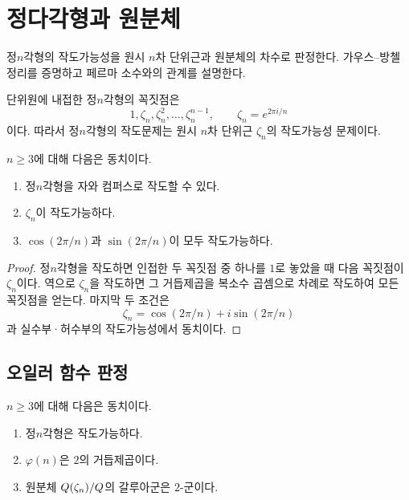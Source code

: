 \clearpage
\section{정다각형과 원분체}
\label{sec:construction-regular-polygons}

\begin{learninggoal}
정$n$각형의 작도가능성을 원시 $n$차 단위근과 원분체의 차수로 판정한다. 가우스--방첼 정리를 증명하고 페르마 소수와의 관계를 설명한다.
\end{learninggoal}

단위원에 내접한 정$n$각형의 꼭짓점은
\[
  1,\zeta_n,\zeta_n^2,\dots,\zeta_n^{n-1},
  \qquad
  \zeta_n=e^{2\pi i/n}
\]
이다. 따라서 정$n$각형의 작도문제는 원시 $n$차 단위근 $\zeta_n$의 작도가능성 문제이다.

\begin{proposition}
$n\ge3$에 대해 다음은 동치이다.
\begin{enumerate}[label=(\roman*)]
  \item 정$n$각형을 자와 컴퍼스로 작도할 수 있다.
  \item $\zeta_n$이 작도가능하다.
  \item $\cos(2\pi/n)$과 $\sin(2\pi/n)$이 모두 작도가능하다.
\end{enumerate}
\end{proposition}

\begin{proof}
정$n$각형을 작도하면 인접한 두 꼭짓점 중 하나를 $1$로 놓았을 때 다음 꼭짓점이 $\zeta_n$이다. 역으로 $\zeta_n$을 작도하면 그 거듭제곱을 복소수 곱셈으로 차례로 작도하여 모든 꼭짓점을 얻는다. 마지막 두 조건은
\[
  \zeta_n=\cos(2\pi/n)+i\sin(2\pi/n)
\]
과 실수부·허수부의 작도가능성에서 동치이다.
\end{proof}

\subsection{오일러 함수 판정}

\begin{theorem}[정다각형 작도 판정]
\label{thm:regular-polygon-phi}
$n\ge3$에 대해 다음은 동치이다.
\begin{enumerate}[label=(\roman*)]
  \item 정$n$각형은 작도가능하다.
  \item $\varphi(n)$은 $2$의 거듭제곱이다.
  \item 원분체 $Q(\zeta_n)/Q$의 갈루아군은 $2$-군이다.
\end{enumerate}
\end{theorem}

